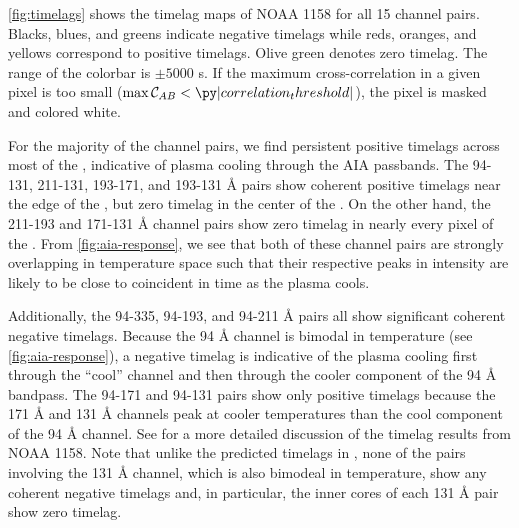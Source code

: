 \autoref{fig:timelags} shows the timelag maps of \AR{} NOAA 1158 for all 15 channel pairs. Blacks, blues, and greens indicate negative timelags while reds, oranges, and yellows correspond to positive timelags. Olive green denotes zero timelag. The range of the colorbar is $\pm5000$ s. If the maximum cross-correlation in a given pixel is too small ($\max\mathcal{C}_{AB}<\py|correlation_threshold|$), the pixel is masked and colored white.

For the majority of the channel pairs, we find persistent positive timelags across most of the \AR{}, indicative of plasma cooling through the AIA passbands. The 94-131, 211-131, 193-171, and 193-131 \AA{} pairs show coherent positive timelags near the edge of the \AR{}, but zero timelag in the center of the \AR{}. On the other hand, the 211-193 and 171-131 \AA{} channel pairs show zero timelag in nearly every pixel of the \AR{}. From \autoref{fig:aia-response}, we see that both of these channel pairs are strongly overlapping in temperature space such that their respective peaks in intensity are likely to be close to coincident in time as the plasma cools. 

Additionally, the 94-335, 94-193, and 94-211 \AA{} pairs all show significant coherent negative timelags. Because the 94 \AA{} channel is bimodal in temperature (see \autoref{fig:aia-response}), a negative timelag is indicative of the plasma cooling first through the ``cool'' channel and then through the cooler component of the 94 \AA{} bandpass. The 94-171 and 94-131 pairs show only positive timelags because the 171 \AA{} and 131 \AA{} channels peak at cooler temperatures than the cool component of the 94 \AA{} channel. See \citet{viall_survey_2017} for a more detailed discussion of the timelag results from NOAA 1158. Note that unlike the predicted timelags in , none of the pairs involving the 131 \AA{} channel, which is also bimodeal in temperature, show any coherent negative timelags and, in particular, the inner cores of each 131 \AA{} pair show zero timelag.

